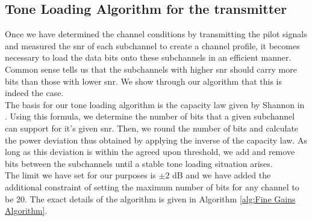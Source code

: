\subsection{Tone Loading Algorithm for the transmitter}
Once we have determined the channel conditions by transmitting the pilot signals and measured the \acrshort{snr} of each subchannel to create a channel profile, it becomes necessary to load the data bits onto these subchannels in an efficient manner. Common sense tells us that the subchannels with higher \acrshort{snr} should carry more bits than those with lower \acrshort{snr}. We show through our algorithm that this is indeed the case.\\
The basis for our tone loading algorithm is the capacity law given by Shannon in \textcite{Shannnon1948}. Using this formula, we determine the number of bits that a given subchannel can support for it's given \acrshort{snr}. Then, we round the number of bits and calculate the power deviation thus obtained by applying the inverse of the capacity law. As long as this deviation is within the agreed upon threshold, we add and remove bits between the subchannels until a stable tone loading situation arises.\\
The limit we have set for our purposes is $\pm 2$ dB and we have added the additional constraint of setting the maximum number of bits for any channel to be 20. The exact details of the algorithm is given in Algorithm \ref{alg:Fine Gains Algorithm}.

